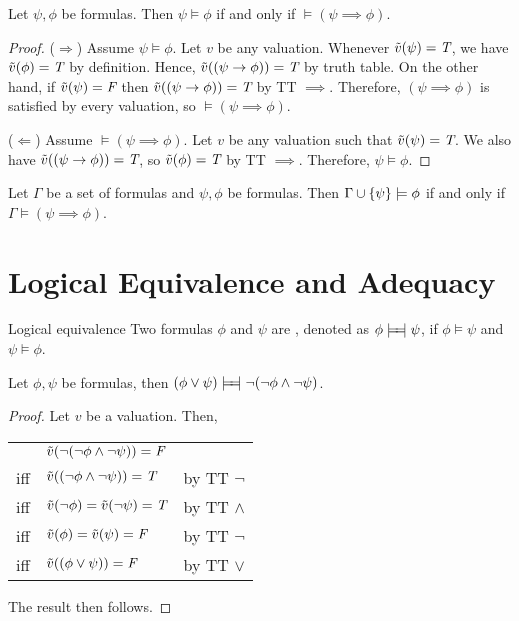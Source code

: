 \documentclass{styles/tufte}
\begin{document}
  \begin{lemma}{}{}
    Let $\psi, \phi$ be formulas. Then $\psi \models \phi$ if and only if $\models (\psi \implies \phi)$.
  \end{lemma}
  \begin{proof}
    ($\Rightarrow$) Assume $\psi \models \phi$. Let $v$ be any valuation. Whenever $\tilde{v}(\psi) = \textit{T}$, we have $\tilde{v}(\phi) = \textit{T}$ by definition. Hence, $\tilde{v}((\psi \rightarrow \phi)) = \textit{T}$ by truth table. On the other hand, if $\tilde{v}(\psi) = \textit{F}$ then $\tilde{v}((\psi \rightarrow \phi)) = \textit{T}$ by TT $\implies$. Therefore, $(\psi \implies \phi)$ is satisfied by every valuation, so $\models (\psi \implies \phi)$.
    
    ($\Leftarrow$) Assume $\models (\psi \implies \phi)$. Let $v$ be any valuation such that $\tilde{v}(\psi) = \textit{T}$. We also have $\tilde{v}((\psi \rightarrow \phi)) = \textit{T}$, so $\tilde{v}(\phi) = \textit{T}$ by TT $\implies$. Therefore, $\psi \models \phi$.
  \end{proof}
  
  \begin{lemma}{}{}
    Let $\Gamma$ be a set of formulas and $\psi, \phi$ be formulas. Then $\Gamma \cup \set{\psi} \models \phi$ if and only if $\Gamma \models (\psi \implies \phi)$.
  \end{lemma}



\section{Logical Equivalence and Adequacy}

\begin{definition}{Logical equivalence}{}
  Two formulas $\phi$ and $\psi$ are , denoted as $\phi \lequiv \psi$, if $\phi \models \psi$ and $\psi \models \phi$.
\end{definition}

\begin{lemma}{}{}
  Let $\phi, \psi$ be formulas, then $(\phi \lor \psi) \lequiv \neg(\neg\phi \land \neg\psi)$.
\end{lemma}
\begin{proof}
  Let $v$ be a valuation. Then,
  \begin{center}
  \begin{tabular}{lll}
    & $\tilde{v}(\neg(\neg\phi \land \neg\psi)) = \textit{F}$ & \\
    iff & $\tilde{v}((\neg\phi \land \neg\psi)) = \textit{T}$ & by TT $\neg$ \\
    iff & $\tilde{v}(\neg\phi) = \tilde{v}(\neg\psi) = \textit{T}$ & by TT $\land$ \\
    iff & $\tilde{v}(\phi) = \tilde{v}(\psi) = \textit{F}$ & by TT $\neg$ \\
    iff & $\tilde{v}((\phi \lor \psi)) = \textit{F}$ & by TT $\lor$
  \end{tabular}
  \end{center}
  The result then follows.
\end{proof}
\end{document}
